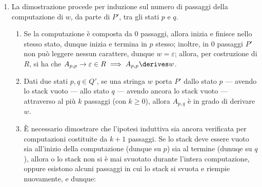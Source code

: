 \documentclass[a4paper, 12pt]{report}
\begin{document}
{\begin{enumerate}[label=]
\begin{enumerate}[label=]
\begin{itemize}
                                allora $w$ è in grado di portare $P'$ dallo stato $p$ allo stato $q$, lasciando invariato lo stack.
                            \item differentemente, nel secondo caso, siano $y$ e $z$ sottostringhe di $w$ generate rispettivamente da $A_{p, r}$ ed $A_{r, q}$ dunque $\soe{l}{A_{p,r} \derives y \\ A_{r,q} \derives z} \implies w = yz$, e si noti che $y$ e $z$ sono state derivate con $k + 1$ passaggi; allora, per ipotesi induttiva forte, $y$ e $z$ portano, rispettivamente, $P'$ dagli stati $p$ ed $r$ --- avendo lo stack vuoto --- agli stati $r$ e $q$ --- avendo ancora lo stack vuoto; allora, $w$ è in grado di portare $P'$ dallo stato $p$ allo stato $q$, lasciando invariato lo stack;
                        \end{itemize}
                \end{enumerate}
            \item {} La dimostrazione procede per induzione sul numero di passaggi della computazione di $w$, da parte di $P'$, tra gli stati $p$ e $q$.
                \begin{enumerate}[label=]
                    \item {} Se la computazione è composta da 0 passaggi, allora inizia e finisce nello stesso stato, dunque inizia e termina in $p$ stesso; inoltre, in 0 passaggi $P'$ non può leggere nessun carattere, dunque $w = \varepsilon$; allora, per costruzione di $R$, si ha che $A_{p,p} \to \varepsilon \in R \implies A_{p,p} \derives w$.
                    \item {} Dati due stati $p, q \in Q'$, se una stringa $w$ porta $P'$ dallo stato $p$ --- avendo lo stack vuoto --- allo stato $q$ --- avendo ancora lo stack vuoto --- attraverso al più $k$ passaggi (con $k \ge 0$), allora $A_{p,q}$ è in grado di derivare $w$.
                    \item {} È necessario dimostrare che l'ipotesi induttiva sia ancora verificata per computazioni costituite da $k + 1$ passaggi. Se lo stack deve essere vuoto sia all'inizio della computazione (dunque su $p$) sia al termine (dunuqe su $q$), allora o lo stack non si è mai svuotato durante l'intera computazione, oppure esistono alcuni passaggi in cui lo stack si svuota e riempie nuovamente, e dunque:


\end{enumerate}
\end{enumerate}}
\end{document}
